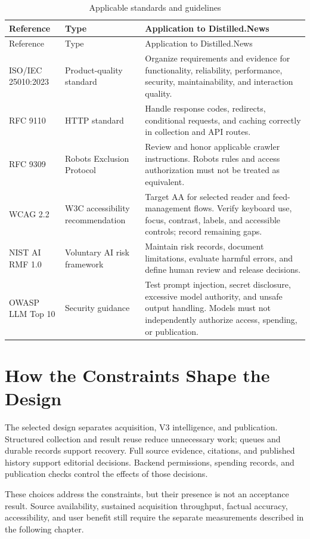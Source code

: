 \begingroup
\small
\renewcommand{\arraystretch}{1.08}
\begin{longtable}{L{3cm}L{2.5cm}L{\dimexpr\linewidth-5.5cm-6\tabcolsep\relax}}
\caption{Applicable standards and guidelines}\label{tab:standards}\\
\toprule Reference & Type & Application to Distilled.News \\ \midrule
\endfirsthead
\toprule Reference & Type & Application to Distilled.News \\ \midrule
\endhead
\bottomrule
\endfoot
ISO/IEC 25010:2023 \cite{iso25010} & Product-quality standard & Organize requirements and evidence for functionality, reliability, performance, security, maintainability, and interaction quality. \\
RFC 9110 \cite{rfc9110} & HTTP standard & Handle response codes, redirects, conditional requests, and caching correctly in collection and API routes. \\
RFC 9309 \cite{rfc9309} & Robots Exclusion Protocol & Review and honor applicable crawler instructions. Robots rules and access authorization must not be treated as equivalent. \\
WCAG 2.2 \cite{wcag22} & W3C accessibility recommendation & Target AA for selected reader and feed-management flows. Verify keyboard use, focus, contrast, labels, and accessible controls; record remaining gaps. \\
NIST AI RMF 1.0 \cite{nistairmf} & Voluntary AI risk framework & Maintain risk records, document limitations, evaluate harmful errors, and define human review and release decisions. \\
OWASP LLM Top 10 \cite{owasp2025} & Security guidance & Test prompt injection, secret disclosure, excessive model authority, and unsafe output handling. Models must not independently authorize access, spending, or publication. \\
\end{longtable}
\endgroup

\section{How the Constraints Shape the Design}

The selected design separates acquisition, V3 intelligence, and publication. Structured collection and result reuse reduce unnecessary work; queues and durable records support recovery. Full source evidence, citations, and published history support editorial decisions. Backend permissions, spending records, and publication checks control the effects of those decisions.

These choices address the constraints, but their presence is not an acceptance result. Source availability, sustained acquisition throughput, factual accuracy, accessibility, and user benefit still require the separate measurements described in the following chapter.